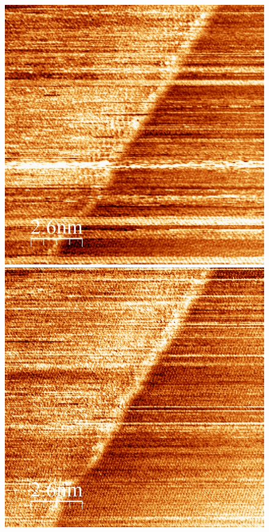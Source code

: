 \documentclass[12pt,a4paper]{article}
\begin{document}
\begin{figure}
\centering
\includegraphics[scale=0.3]{Bilder/Igain4000.jpg}
\includegraphics[scale=0.3]{Bilder/Igain8000.jpg}

\end{figure}
\end{document}
